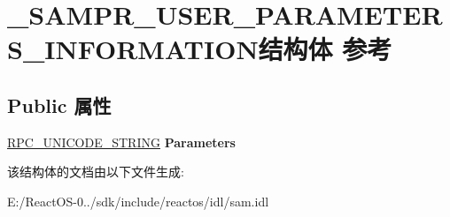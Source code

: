 \hypertarget{struct___s_a_m_p_r___u_s_e_r___p_a_r_a_m_e_t_e_r_s___i_n_f_o_r_m_a_t_i_o_n}{}\section{\+\_\+\+S\+A\+M\+P\+R\+\_\+\+U\+S\+E\+R\+\_\+\+P\+A\+R\+A\+M\+E\+T\+E\+R\+S\+\_\+\+I\+N\+F\+O\+R\+M\+A\+T\+I\+O\+N结构体 参考}
\label{struct___s_a_m_p_r___u_s_e_r___p_a_r_a_m_e_t_e_r_s___i_n_f_o_r_m_a_t_i_o_n}
\subsection*{Public 属性}
\begin{DoxyCompactItemize}
\item 
\mbox{\label{struct___s_a_m_p_r___u_s_e_r___p_a_r_a_m_e_t_e_r_s___i_n_f_o_r_m_a_t_i_o_n_a3eff069b3a1c6982183b00a8339094f6}} 
\hyperlink{struct___r_p_c___u_n_i_c_o_d_e___s_t_r_i_n_g}{R\+P\+C\+\_\+\+U\+N\+I\+C\+O\+D\+E\+\_\+\+S\+T\+R\+I\+NG} {\bfseries Parameters}
\end{DoxyCompactItemize}


该结构体的文档由以下文件生成\+:\begin{DoxyCompactItemize}
\item 
E\+:/\+React\+O\+S-\/0../sdk/include/reactos/idl/sam.\+idl\end{DoxyCompactItemize}
